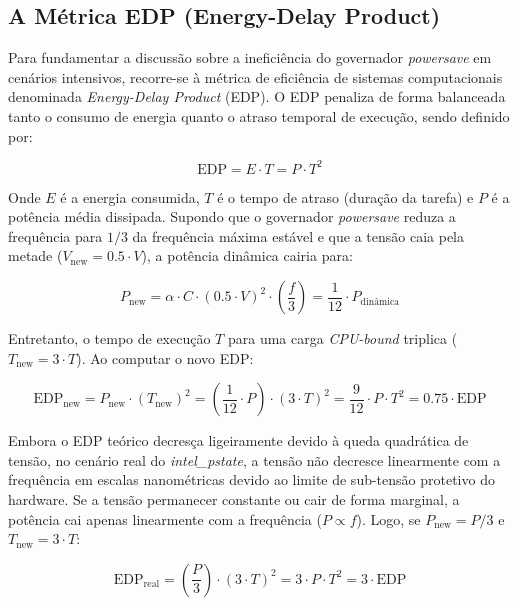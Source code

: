 \documentclass[12pt]{article}
\begin{document}
\subsection{A Métrica EDP (Energy-Delay Product)}

Para fundamentar a discussão sobre a ineficiência do governador \textit{powersave} em cenários intensivos, recorre-se à métrica de eficiência de sistemas computacionais denominada \textit{Energy-Delay Product} (EDP). O EDP penaliza de forma balanceada tanto o consumo de energia quanto o atraso temporal de execução, sendo definido por:

\begin{equation}
\text{EDP} = E \cdot T = P \cdot T^2
\end{equation}

Onde $E$ é a energia consumida, $T$ é o tempo de atraso (duração da tarefa) e $P$ é a potência média dissipada. Supondo que o governador \textit{powersave} reduza a frequência para $1/3$ da frequência máxima estável e que a tensão caia pela metade ($V_{\text{new}} = 0.5 \cdot V$), a potência dinâmica cairia para:

\begin{equation}
P_{\text{new}} = \alpha \cdot C \cdot (0.5 \cdot V)^2 \cdot \left(\frac{f}{3}\right) = \frac{1}{12} \cdot P_{\text{dinâmica}}
\end{equation}

Entretanto, o tempo de execução $T$ para uma carga \textit{CPU-bound} triplica ($T_{\text{new}} = 3 \cdot T$). Ao computar o novo EDP:

\begin{equation}
\text{EDP}_{\text{new}} = P_{\text{new}} \cdot (T_{\text{new}})^2 = \left(\frac{1}{12} \cdot P\right) \cdot (3 \cdot T)^2 = \frac{9}{12} \cdot P \cdot T^2 = 0.75 \cdot \text{EDP}
\end{equation}

Embora o EDP teórico decresça ligeiramente devido à queda quadrática de tensão, no cenário real do \textit{intel\_pstate}, a tensão não decresce linearmente com a frequência em escalas nanométricas devido ao limite de sub-tensão protetivo do hardware. Se a tensão permanecer constante ou cair de forma marginal, a potência cai apenas linearmente com a frequência ($P \propto f$). Logo, se $P_{\text{new}} = P/3$ e $T_{\text{new}} = 3 \cdot T$:

\begin{equation}
\text{EDP}_{\text{real}} = \left(\frac{P}{3}\right) \cdot (3 \cdot T)^2 = 3 \cdot P \cdot T^2 = 3 \cdot \text{EDP}
\end{equation}
\end{document}
